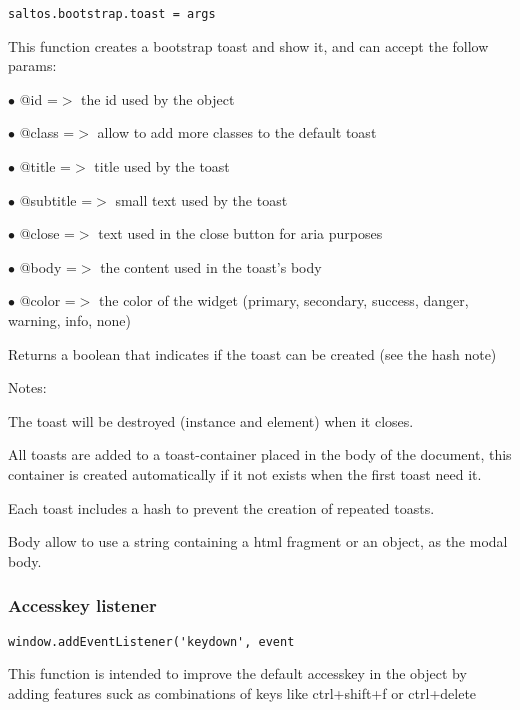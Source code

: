\documentclass[a4paper]{article}
\begin{document}
\begin{lstlisting}
saltos.bootstrap.toast = args
\end{lstlisting}

This function creates a bootstrap toast and show it, and can accept the follow params:

\begin{compactitem}
\item[\color{myblue}$\bullet$] @id       =$>$ the id used by the object
\item[\color{myblue}$\bullet$] @class    =$>$ allow to add more classes to the default toast
\item[\color{myblue}$\bullet$] @title    =$>$ title used by the toast
\item[\color{myblue}$\bullet$] @subtitle =$>$ small text used by the toast
\item[\color{myblue}$\bullet$] @close    =$>$ text used in the close button for aria purposes
\item[\color{myblue}$\bullet$] @body     =$>$ the content used in the toast's body
\item[\color{myblue}$\bullet$] @color    =$>$ the color of the widget (primary, secondary, success, danger, warning, info, none)
\end{compactitem}

Returns a boolean that indicates if the toast can be created (see the hash note)

Notes:

The toast will be destroyed (instance and element) when it closes.

All toasts are added to a toast-container placed in the body of the document, this container
is created automatically if it not exists when the first toast need it.

Each toast includes a hash to prevent the creation of repeated toasts.

Body allow to use a string containing a html fragment or an object, as the modal body.

\hypertarget{toc667}{}
\subsubsection{Accesskey listener}

\begin{lstlisting}
window.addEventListener('keydown', event
\end{lstlisting}

This function is intended to improve the default accesskey in the object by
adding features suck as combinations of keys like ctrl+shift+f or ctrl+delete
\end{document}

